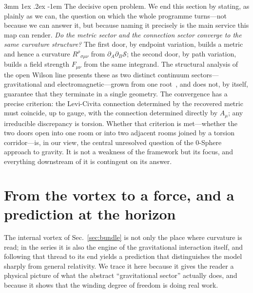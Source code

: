 \documentclass[%
 reprint, amsmath,amssymb, aps, prb, ]{revtex4-2}
\makeatletter
\numberwithin{equation}{section}
\renewcommand\paragraph{%
  \@startsection{paragraph}{4}{\z@}%
    {3mm \@plus 1ex \@minus .2ex}%
    {-1em}%
    {\normalfont\normalsize\itshape}}
\makeatother
\begin{document}
\paragraph{The decisive open problem.}
We end this section by stating, as plainly as we can, the question on which the whole programme turns---not because we can answer it, but because naming it precisely is the main service this map can render. \emph{Do the metric sector and the connection sector converge to the same curvature structure?} The first door, by endpoint variation, builds a metric and hence a curvature $R^\rho{}_{\sigma\mu\nu}$ from $\partial_A\partial_B\mathcal{S}$; the second door, by path variation, builds a field strength $F_{\mu\nu}$ from the same integrand. The structural analysis of the open Wilson line presents these as two distinct continuum sectors---gravitational and electromagnetic---grown from one root~\cite{hanamura55}, and does not, by itself, guarantee that they terminate in a single geometry. The convergence has a precise criterion: the Levi-Civita connection determined by the recovered metric must coincide, up to gauge, with the connection determined directly by $A_\mu$; any irreducible discrepancy is torsion. Whether that criterion is met---whether the two doors open into one room or into two adjacent rooms joined by a torsion corridor---is, in our view, the central unresolved question of the 0-Sphere approach to gravity. It is not a weakness of the framework but its focus, and everything downstream of it is contingent on its answer.

\section{From the vortex to a force, and a prediction at the horizon}
\label{sec:vortex-force}

The internal vortex of Sec.~\ref{sec:bundle} is not only the place where curvature is read; in the series it is also the engine of the gravitational interaction itself, and following that thread to its end yields a prediction that distinguishes the model sharply from general relativity. We trace it here because it gives the reader a physical picture of what the abstract ``gravitational sector'' actually does, and because it shows that the winding degree of freedom is doing real work.
\end{document}
